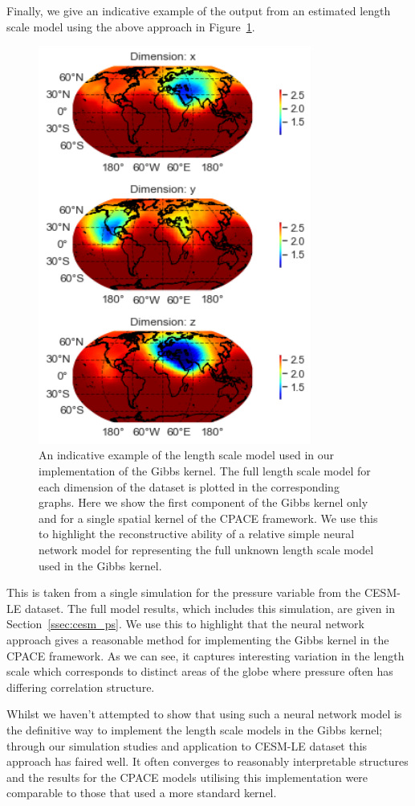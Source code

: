 Finally, we give an indicative example of the output from an estimated length scale model using the above approach in Figure~\ref{fig:gibbs_lengthscale}.
\begin{figure}
	\centering
	\includegraphics[width=0.8\textwidth]{gibbs_lengthscale}
	\caption[An indicative example of the length scale model used in our implementation of the Gibbs kernel.]{An indicative example of the length scale model used in our implementation of the Gibbs kernel. The full length scale model for each dimension of the dataset is plotted in the corresponding graphs. Here we show the first component of the Gibbs kernel only and for a single spatial kernel of the CPACE framework. We use this to highlight the reconstructive ability of a relative simple neural network model for representing the full unknown length scale model used in the Gibbs kernel.}
	\label{fig:gibbs_lengthscale}
\end{figure}
This is taken from a single simulation for the pressure variable from the CESM-LE dataset.
The full model results, which includes this simulation, are given in Section~\ref{ssec:cesm_ps}.
We use this to highlight that the neural network approach gives a reasonable method for implementing the Gibbs kernel in the CPACE framework.
As we can see, it captures interesting variation in the length scale which corresponds to distinct areas of the globe where pressure often has differing correlation structure.

Whilst we haven't attempted to show that using such a neural network model is the definitive way to implement the length scale models in the Gibbs kernel; through our simulation studies and application to CESM-LE dataset this approach has faired well.
It often converges to reasonably interpretable structures and the results for the CPACE models utilising this implementation were comparable to those that used a more standard kernel.

